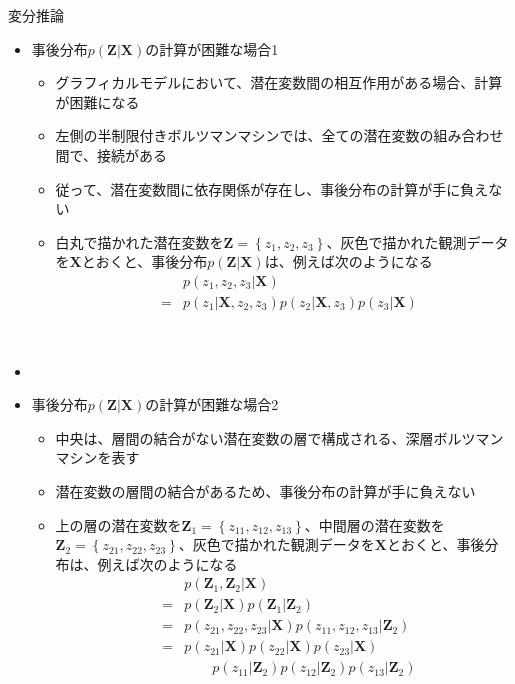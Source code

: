 \documentclass[dvipdfmx,notheorems,t]{beamer}
\begin{document}
\begin{frame}{変分推論}

\begin{itemize}
	\item 事後分布$p(\bm{Z} | \bm{X})$の計算が困難な場合1
	\begin{itemize}
		\item グラフィカルモデルにおいて、\alert{潜在変数間の相互作用がある}場合、計算が困難になる
		\newline
		\item 左側の\alert{半制限付きボルツマンマシン}では、全ての潜在変数の組み合わせ間で、接続がある
		\item 従って、潜在変数間に\alert{依存関係}が存在し、事後分布の計算が手に負えない
		\newline
		\item 白丸で描かれた潜在変数を$\bm{Z} = \left\{ z_1, z_2, z_3 \right\}$、灰色で描かれた観測データを$\bm{X}$とおくと、事後分布$p(\bm{Z} | \bm{X})$は、例えば次のようになる
		\begin{eqnarray}
			&& p(z_1, z_2, z_3 | \bm{X}) \nonumber \\
			&=& p(z_1 | \bm{X}, z_2, z_3) p(z_2 | \bm{X}, z_3) p(z_3 | \bm{X})
		\end{eqnarray}
	\end{itemize} \
	
	\item \item 事後分布$p(\bm{Z} | \bm{X})$の計算が困難な場合2
	\begin{itemize}
		\item 中央は、層間の結合がない潜在変数の層で構成される、\alert{深層ボルツマンマシン}を表す
		\item 潜在変数の層間の結合があるため、事後分布の計算が手に負えない
		\newline
		\item 上の層の潜在変数を$\bm{Z}_1 = \left\{ z_{11}, z_{12}, z_{13} \right\}$、中間層の潜在変数を$\bm{Z}_2 = \left\{ z_{21}, z_{22}, z_{23} \right\}$、灰色で描かれた観測データを$\bm{X}$とおくと、事後分布は、例えば次のようになる
		\begin{eqnarray}
			&& p(\bm{Z}_1, \bm{Z}_2 | \bm{X}) \nonumber \\
			&=& p(\bm{Z}_2 | \bm{X}) p(\bm{Z}_1 | \bm{Z}_2) \\
			&=& p(z_{21}, z_{22}, z_{23} | \bm{X}) p(z_{11}, z_{12}, z_{13} | \bm{Z}_2) \nonumber \\
			&=& p(z_{21} | \bm{X}) p(z_{22} | \bm{X}) p(z_{23} | \bm{X}) \nonumber \\
			&& \qquad p(z_{11} | \bm{Z}_2) p(z_{12} | \bm{Z}_2) p(z_{13} | \bm{Z}_2)
		\end{eqnarray}
	\end{itemize}
\end{itemize}

\end{frame}
\end{document}
